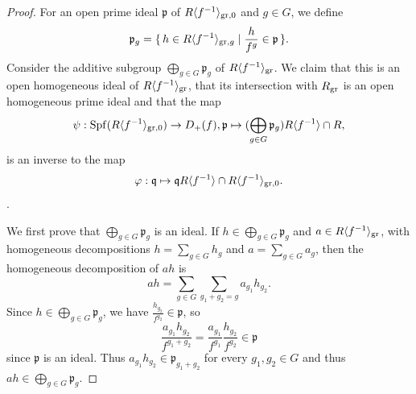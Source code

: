 \documentclass[12pt,twoside,a4paper]{article}
\theoremstyle{definition}
\theoremstyle{remark}
\newcommand\gr{{\rm gr}}
\newcommand\Spf{{\rm Spf}}
\begin{document}
\begin{proof}For an open prime ideal $\mathfrak{p}$ of $R\langle f^{-1}\rangle_{\gr, 0}$ and $g\in G$, we define \begin{equation*}\mathfrak{p}_{g}=\{\, h\in R\langle f^{-1}\rangle_{\gr, g}\mid \frac{h}{f^{g}}\in \mathfrak{p}\,\}.\end{equation*}Consider the additive subgroup $\bigoplus_{g\in G}\mathfrak{p}_{g}$ of $R\langle f^{-1}\rangle_{\gr}$. We claim that this is an open homogeneous ideal of $R\langle f^{-1}\rangle_{\gr}$, that its intersection with $R_{\gr}$ is an open homogeneous prime ideal and that the map \begin{equation*}\psi: \Spf(R\langle f^{-1}\rangle_{\gr, 0})\to D_{+}(f), \mathfrak{p}\mapsto (\bigoplus_{g\in G}\mathfrak{p}_{g})R\langle f^{-1}\rangle\cap R,\end{equation*}is an inverse to the map \begin{equation*}\varphi: \mathfrak{q}\mapsto \mathfrak{q}R\langle f^{-1}\rangle\cap R\langle f^{-1}\rangle_{\gr, 0}.\end{equation*}.

We first prove that $\bigoplus_{g\in G}\mathfrak{p}_{g}$ is an ideal. If $h\in \bigoplus_{g\in G}\mathfrak{p}_{g}$ and $a\in R\langle f^{-1}\rangle_{\gr}$, with homogeneous decompositions $h=\sum_{g\in G}h_{g}$ and $a=\sum_{g\in G}a_{g}$, then the homogeneous decomposition of $ah$ is \begin{equation*}ah=\sum_{g\in G}\sum_{g_{1}+g_{2}=g}a_{g_{1}}h_{g_{2}}.\end{equation*}Since $h\in \bigoplus_{g\in G}\mathfrak{p}_{g}$, we have $\frac{h_{g_{2}}}{f^{g_{2}}}\in \mathfrak{p}$, so \begin{equation*}\frac{a_{g_{1}}h_{g_{2}}}{f^{g_{1}+g_{2}}}=\frac{a_{g_{1}}}{f^{g_{1}}}\frac{h_{g_{2}}}{f^{g_{2}}}\in \mathfrak{p}\end{equation*}since $\mathfrak{p}$ is an ideal. Thus $a_{g_{1}}h_{g_{2}}\in \mathfrak{p}_{g_{1}+g_{2}}$ for every $g_{1}, g_{2}\in G$ and thus $ah\in \bigoplus_{g\in G}\mathfrak{p}_{g}$.


\end{proof}
\end{document}
